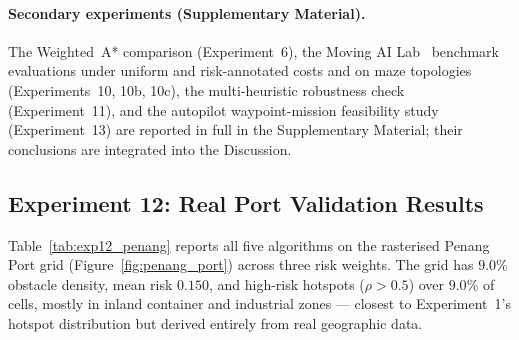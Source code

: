 \documentclass[preprint,12pt,authoryear]{elsarticle}
\begin{document}
\paragraph{Secondary experiments (Supplementary Material).} The Weighted~A* comparison (Experiment~6), the Moving AI Lab~\citep{Sturtevant2012} benchmark evaluations under uniform and risk-annotated costs and on maze topologies (Experiments~10, 10b, 10c), the multi-heuristic robustness check (Experiment~11), and the autopilot waypoint-mission feasibility study (Experiment~13) are reported in full in the Supplementary Material; their conclusions are integrated into the Discussion.

\subsection{Experiment 12: Real Port Validation Results}\label{subsec:exp12_results}

Table~\ref{tab:exp12_penang} reports all five algorithms on the rasterised Penang Port grid (Figure~\ref{fig:penang_port}) across three risk weights. The grid has $9.0\%$ obstacle density, mean risk $0.150$, and high-risk hotspots ($\rho > 0.5$) over $9.0\%$ of cells, mostly in inland container and industrial zones --- closest to Experiment~1's hotspot distribution but derived entirely from real geographic data.

\begin{table}[!htbp]
\centering
\caption{Real port validation on Penang Port NBCT ($500\times500$ grid from OpenStreetMap; 30 random start--goal pairs per row, minimum endpoint separation 40\% of grid diagonal, seed 20260518). Speedup is wall-clock relative to A*; Red.\% is node-reduction percentage relative to A*; Opt is path cost ratio relative to A*. JPS paths are densified to the full 8-connected cell sequence before scoring. JPS reported only at $\lambda=0$ (it does not operate on risk-weighted grids).}
\label{tab:exp12_penang}
\end{table}
\end{document}
